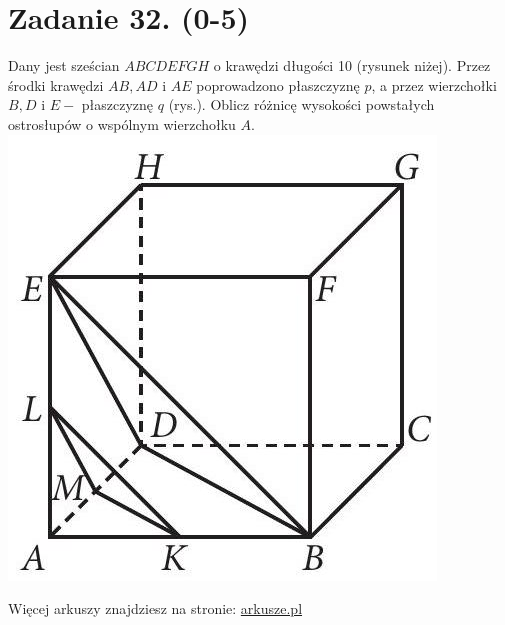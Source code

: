 \documentclass[10pt]{article}
\begin{document}
\section*{Zadanie 32. (0-5)}
Dany jest sześcian \(A B C D E F G H\) o krawędzi długości 10 (rysunek niżej). Przez środki krawędzi \(A B, A D\) i \(A E\) poprowadzono płaszczyznę \(p\), a przez wierzchołki \(B, D\) i \(E-\) płaszczyznę \(q\) (rys.). Oblicz różnicę wysokości powstałych ostrosłupów o wspólnym wierzchołku \(A\).\\
\includegraphics[max width=\textwidth, center]{2024_11_21_dd21f7544b65bcf1b3c7g-20}

Więcej arkuszy znajdziesz na stronie: \href{http://arkusze.pl}{arkusze.pl}
\end{document}
